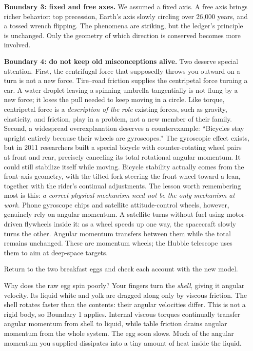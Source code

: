 \textbf{Boundary 3: fixed and free axes.} We assumed a fixed axis. A free axis brings richer behavior: top precession, Earth's axis slowly circling over 26,000 years, and a tossed wrench flipping. The phenomena are striking, but the ledger's principle is unchanged. Only the geometry of which direction is conserved becomes more involved.

\textbf{Boundary 4: do not keep old misconceptions alive.} Two deserve special attention. First, the centrifugal force that supposedly throws you outward on a turn is not a new force. Tire--road friction supplies the centripetal force turning a car. A water droplet leaving a spinning umbrella tangentially is not flung by a new force; it loses the pull needed to keep moving in a circle. Like torque, centripetal force is a \emph{description of the role} existing forces, such as gravity, elasticity, and friction, play in a problem, not a new member of their family. Second, a widespread overexplanation deserves a counterexample: ``Bicycles stay upright entirely because their wheels are gyroscopes.'' The gyroscopic effect exists, but in 2011 researchers built a special bicycle with counter-rotating wheel pairs at front and rear, precisely canceling its total rotational angular momentum. It could still stabilize itself while moving. Bicycle stability actually comes from the front-axis geometry, with the tilted fork steering the front wheel toward a lean, together with the rider's continual adjustments. The lesson worth remembering most is this: \emph{a correct physical mechanism need not be the only mechanism at work}. Phone gyroscope chips and satellite attitude-control wheels, however, genuinely rely on angular momentum. A satellite turns without fuel using motor-driven flywheels inside it: as a wheel speeds up one way, the spacecraft slowly turns the other. Angular momentum transfers between them while the total remains unchanged. These are momentum wheels; the Hubble telescope uses them to aim at deep-space targets.


Return to the two breakfast eggs and check each account with the new model.

Why does the raw egg spin poorly? Your fingers turn the \emph{shell}, giving it angular velocity. Its liquid white and yolk are dragged along only by viscous friction. The shell rotates faster than the contents: their angular velocities differ. This is not a rigid body, so Boundary 1 applies. Internal viscous torques continually transfer angular momentum from shell to liquid, while table friction drains angular momentum from the whole system. The egg soon slows. Much of the angular momentum you supplied dissipates into a tiny amount of heat inside the liquid.

